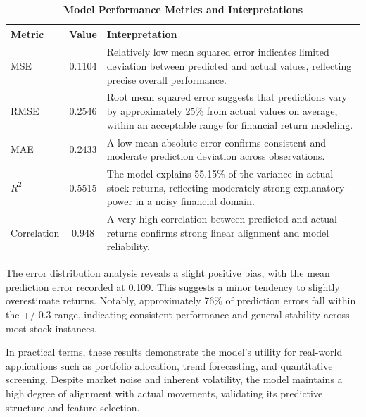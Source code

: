 \documentclass[3p,times,procedia]{elsarticle}
\begin{document}
\begin{table}[!ht]
\centering
\caption{\textbf{Model Performance Metrics and Interpretations}}
\begin{tabular}{|l|c|l|}
\hline
\textbf{Metric} & \textbf{Value} & \textbf{Interpretation} \\
\hline
MSE         & 0.1104 & \begin{minipage}[t]{8cm}Relatively low mean squared error indicates limited deviation between predicted and actual values, reflecting precise overall performance.\end{minipage} \\[2ex]
RMSE        & 0.2546 & \begin{minipage}[t]{8cm}Root mean squared error suggests that predictions vary by approximately 25\% from actual values on average, within an acceptable range for financial return modeling.\end{minipage} \\[2ex]
MAE         & 0.2433 & \begin{minipage}[t]{8cm}A low mean absolute error confirms consistent and moderate prediction deviation across observations.\end{minipage} \\[2ex]
$R^2$       & 0.5515 & \begin{minipage}[t]{8cm}The model explains 55.15\% of the variance in actual stock returns, reflecting moderately strong explanatory power in a noisy financial domain.\end{minipage} \\[2ex]
Correlation & 0.948  & \begin{minipage}[t]{8cm}A very high correlation between predicted and actual returns confirms strong linear alignment and model reliability.\end{minipage} \\[2ex]
\hline
\end{tabular}
\end{table}

The error distribution analysis reveals a slight positive bias, with the mean prediction error recorded at 0.109. This suggests a minor tendency to slightly overestimate returns. Notably, approximately 76\% of prediction errors fall within the +/-0.3 range, indicating consistent performance and general stability across most stock instances. 

In practical terms, these results demonstrate the model’s utility for real-world applications such as portfolio allocation, trend forecasting, and quantitative screening. Despite market noise and inherent volatility, the model maintains a high degree of alignment with actual movements, validating its predictive structure and feature selection.
\end{document}
